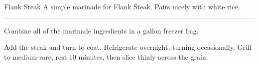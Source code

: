 \begin{recipe}{Flank Steak}{}{}
\freeform A simple marinade for Flank Steak. Pairs nicely with white rice.\\
\rule{\textwidth}{0.05pt}

Combine all of the marinade ingredients in a gallon freezer bag.

Add the steak and turn to coat. Refrigerate overnight, turning occasionally. Grill to medium-rare, rest 10 minutes, then slice thinly across the grain. 

\end{recipe}
